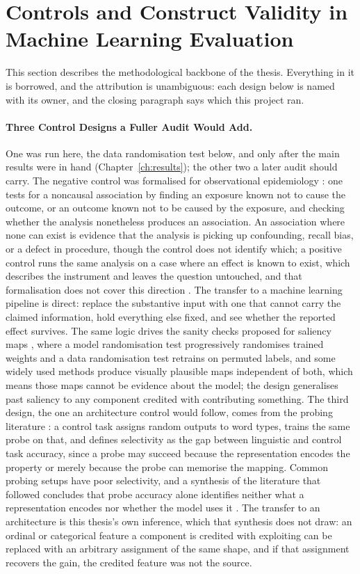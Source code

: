 \section{Controls and Construct Validity in Machine Learning Evaluation}
\label{sec:lit-controls}

This section describes the methodological backbone of the thesis. Everything in
it is borrowed, and the attribution is unambiguous: each design below is named
with its owner, and the closing paragraph says which this project ran.

\paragraph{Three Control Designs a Fuller Audit Would Add.} One was run here, the data
randomisation test below, and only after the main results were in hand
(Chapter~\ref{ch:results}); the other two a later audit should carry.
The negative control was formalised for observational epidemiology
\citep{lipsitch2010negative}: one tests for a noncausal association by finding
an exposure known not to cause the outcome, or an outcome known not to be caused
by the exposure, and checking whether the analysis nonetheless produces an
association. An association where none can exist is evidence that the analysis
is picking up confounding, recall bias, or a defect in procedure, though the
control does not identify which; a positive control runs the same analysis on a
case where an effect is known to exist, which describes the instrument and
leaves the question untouched, and that formalisation does not cover this
direction \citep{lipsitch2010negative}. The transfer to a machine learning
pipeline is direct: replace the substantive input with one that cannot carry the
claimed information, hold everything else fixed, and see whether the reported
effect survives. The same logic drives the sanity checks proposed for saliency
maps \citep{adebayo2018sanity}, where a model randomisation test progressively
randomises trained weights and a data randomisation test retrains on permuted
labels, and some widely used methods produce visually plausible maps independent
of both, which means those maps cannot be evidence about the model; the design
generalises past saliency to any component credited with contributing something.
The third design, the one an architecture control would follow, comes from the
probing literature \citep{hewitt2019control}: a control task assigns random
outputs to word types, trains the same probe on that, and defines selectivity as
the gap between linguistic and control task accuracy, since a probe may succeed
because the representation encodes the property or merely because the probe can
memorise the mapping. Common probing setups have poor selectivity, and a
synthesis of the literature that followed concludes that probe accuracy alone
identifies neither what a representation encodes nor whether the model uses it
\citep{belinkov2022probing}. The transfer to an architecture is this thesis's own
inference, which that synthesis does not draw: an ordinal or categorical feature
a component is credited with exploiting can be replaced with an arbitrary
assignment of the same shape, and if that assignment recovers the gain, the
credited feature was not the source.

